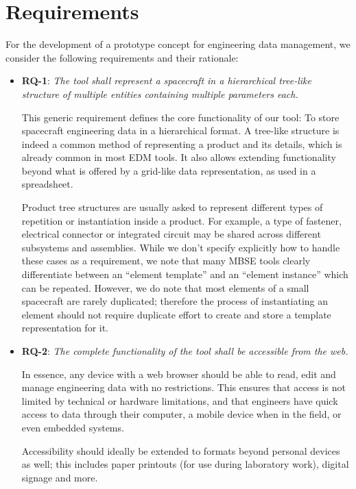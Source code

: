 \documentclass[]{iac}
\begin{document}
\section{Requirements}
\label{sec:requirements}
For the development of a prototype concept for engineering data management, we consider the following requirements and their rationale:
\begin{itemize}[itemsep=6pt]
    \item \textbf{RQ-1}: \emph{The tool shall represent a spacecraft in a hierarchical tree-like structure of multiple entities containing multiple parameters each.}

    This generic requirement defines the core functionality of our tool: To store spacecraft engineering data in a hierarchical format. A tree-like structure is indeed a common method of representing a product and its details, which is already common in most \ac{EDM} tools. It also allows extending functionality beyond what is offered by a grid-like data representation, as used in a spreadsheet.

    Product tree structures are usually asked to represent different types of repetition or instantiation inside a product. For example, a type of fastener, electrical connector or integrated circuit may be shared across different subsystems and assemblies. While we don't specify explicitly how to handle these cases as a requirement, we note that many \ac{MBSE} tools clearly differentiate between an ``element template'' and an ``element instance'' which can be repeated. However, we do note that most elements of a small spacecraft are rarely duplicated; therefore the process of instantiating an element should not require duplicate effort to create and store a template representation for it.

    \item \textbf{RQ-2}: \emph{The complete functionality of the tool shall be accessible from the web.}

    In essence, any device with a web browser should be able to read, edit and manage engineering data with no restrictions. This ensures that access is not limited by technical or hardware limitations, and that engineers have quick access to data through their computer, a mobile device when in the field, or even embedded systems.

    Accessibility should ideally be extended to formats beyond personal devices as well; this includes paper printouts (for use during laboratory work), digital signage and more.


\end{itemize}
\end{document}
